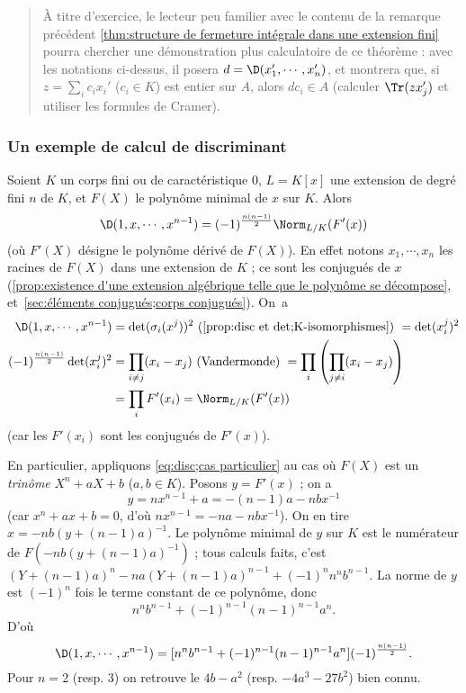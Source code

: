 \documentclass[11pt, %
  title in boldface,
  theorem in new line,
  theorem numbering = section,
  number theorems separately,
  simple name,
]{beaulivre}
\begin{document}
    \begin{quote}
        À titre d'exercice, le lecteur peu familier avec le contenu de la remarque précédent \cref{thm:structure de fermeture intégrale dans une extension fini} pourra chercher une démonstration plus calculatoire de ce théorème : avec les notations ci-dessus, il posera \( d = \D(x_1', \cdots, x_n') \), et montrera que, si \( z = \sum_i c_i x_i' \) (\( c_i \in K \)) est entier sur \( A \), alors \( d c_i \in A \) (calculer \( \Tr(z x_j') \) et utiliser les formules de Cramer).
    \end{quote}

\subsubsection*{Un exemple de calcul de discriminant}
    Soient \( K \) un corps fini ou de caractéristique \( 0 \), \( L = K[x] \) une extension de degré fini \( n \) de \( K \), et \( F(X) \) le polynôme minimal de \( x \) sur \( K \). Alors
    \begin{equation}\label{eq:disc;cas particulier}
        \D(1, x, \cdots, x^{n-1}) = (-1)^{\frac{n(n-1)}{2}} \Norm_{L/K}(F'(x))
    \end{equation}
    (où \( F'(X) \) désigne le polynôme dérivé de \( F(X) \)). En effet notons \( x_1, \cdots, x_n \) les racines de \( F(X) \) dans une extension de \( K \) ; ce sont les conjugués de \( x \) (\cref{prop:existence d'une extension algébrique telle que le polynôme se décompose}, et~\cref{sec:éléments conjugués;corps conjugués}). On~a
    \begingroup
    \allowdisplaybreaks
    \begin{align*}
        \D(1, x, \cdots, x^{n-1}) &= \det(\sigma_i(x^j))^2 \text{ (\cref{prop:disc et det;K-isomorphismes}) } = \det(x_i^j)^2\\
        (-1)^{\frac{n(n-1)}{2}} \det(x_i^j)^2 &= \prod_{i \neq j} (x_i - x_j) \text{ (Vandermonde) } = \prod_i\left(\prod_{j \neq i} (x_i - x_j)\right)\\
        &= \prod_i F'(x_i) = \Norm_{L/K}(F'(x))
    \end{align*}%
    \endgroup%
    (car les \( F'(x_i) \) sont les conjugués de \( F'(x) \)).

    En particulier, appliquons \eqref{eq:disc;cas particulier} au cas où \( F(X) \) est un \emph{trinôme} \( X^n + aX + b \) (\( a,b \in K \)). Posons \( y = F'(x) \) ; on a
    \[
        y = n x^{n-1} + a = -(n-1)a - n b x^{-1}
    \]
    (car \( x^n + ax + b = 0 \), d'où \( n x^{n-1} = -n a - n b x^{-1} \)). On en tire \( x = -nb(y+(n-1)a)^{-1} \). Le polynôme minimal de \( y \) sur \( K \) est le numérateur de \( F(-nb(y+(n-1)a)^{-1}) \) ; tous calculs faits, c'est \( (Y+(n-1)a)^n - na(Y+(n-1)a)^{n-1} + (-1)^n n^n b^{n-1} \). La norme de \( y \) est \( (-1)^n \) fois le terme constant de ce polynôme, donc
    \[
        n^n b^{n-1} + (-1)^{n-1} (n-1)^{n-1} a^n.
    \]
    D'où
    \begin{equation}\label{disc;cas particulier de cas particulier}
        \D(1, x, \cdots, x^{n-1}) = [n^n b^{n-1} + (-1)^{n-1} (n-1)^{n-1} a^n] (-1)^{\frac{n(n-1)}{2}}.
    \end{equation}
    Pour \( n = 2 \) (resp. \( 3 \)) on retrouve le \( 4b-a^2 \) (resp. \( -4a^3-27b^2 \)) bien connu.
\end{document}
